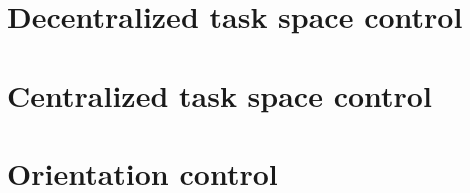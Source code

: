\documentclass[12pt]{article}
\begin{document}
\makefrontpage
\section{Decentralized task space control}

\newpage

\newpage

\newpage

\newpage

\newpage

\newpage

\newpage

\section{Centralized task space control}

\newpage

\newpage

\newpage

\section{Orientation control}

\newpage

\newpage

\newpage

\end{document}
